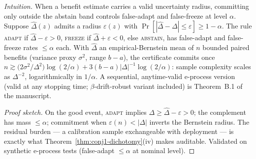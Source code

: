 \begin{theorem}\label{thm:cert}\label{cor:samplecomp}
\emph{Intuition.} When a benefit estimate carries a valid uncertainty radius, committing only
outside the abstain band controls false-adapt and false-freeze at level $\alpha$.
Suppose $\hat\Delta(z)$ admits a radius $\varepsilon(z)$ with
$\Pr[|\hat\Delta-\Delta|\le\varepsilon]\ge1-\alpha$. The rule
\textsc{adapt} if $\hat\Delta-\varepsilon>0$, \textsc{freeze} if
$\hat\Delta+\varepsilon<0$, else \textsc{abstain}, has false-adapt and false-freeze
rates $\le\alpha$ each. With $\hat\Delta$ an empirical-Bernstein mean of $n$ bounded
paired benefits (variance proxy $\sigma^2$, range $b-a$), the certificate commits once
$n\gtrsim\big(2\sigma^2/\Delta^2\big)\log(2/\alpha)+3(b-a)|\Delta|^{-1}\log(2/\alpha)$:
sample complexity scales as $\Delta^{-2}$, logarithmically in $1/\alpha$. A sequential,
anytime-valid e-process version (valid at any stopping time; $\beta$-drift-robust
variant included) is Theorem~B.1 of the manuscript.
\end{theorem}
\begin{proof}[Proof sketch]
On the good event, \textsc{adapt} implies $\Delta\ge\hat\Delta-\varepsilon>0$; the
complement has mass $\le\alpha$; commitment when $\varepsilon(n)<|\Delta|$ inverts the
Bernstein radius. The residual burden --- a calibration sample exchangeable with
deployment --- is exactly what Theorem~\ref{thm:conj1-dichotomy}(iv) makes auditable.
Validated on synthetic e-process tests (false-adapt $\le\alpha$ at nominal level).
\end{proof}

